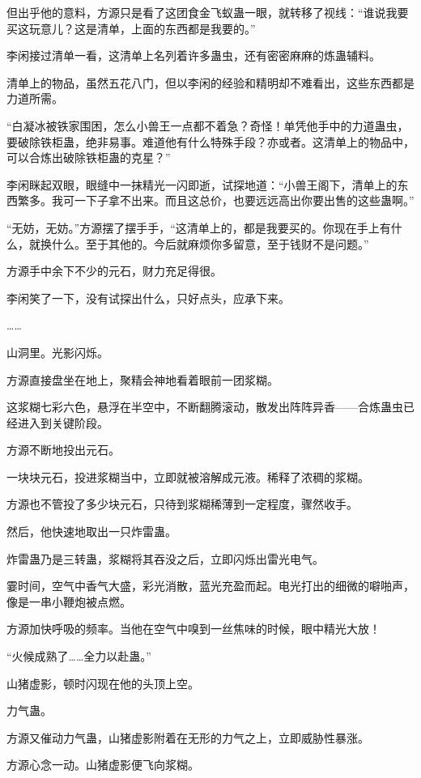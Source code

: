 \begin{this_body}
但出乎他的意料，方源只是看了这团食金飞蚁蛊一眼，就转移了视线：“谁说我要买这玩意儿？这是清单，上面的东西都是我要的。”

李闲接过清单一看，这清单上名列着许多蛊虫，还有密密麻麻的炼蛊辅料。

清单上的物品，虽然五花八门，但以李闲的经验和精明却不难看出，这些东西都是力道所需。

“白凝冰被铁家围困，怎么小兽王一点都不着急？奇怪！单凭他手中的力道蛊虫，要破除铁柜蛊，绝非易事。难道他有什么特殊手段？亦或者。这清单上的物品中，可以合炼出破除铁柜蛊的克星？”

李闲眯起双眼，眼缝中一抹精光一闪即逝，试探地道：“小兽王阁下，清单上的东西繁多。我可一下子拿不出来。而且这总价，也要远远高出你要出售的这些蛊啊。”

“无妨，无妨。”方源摆了摆手手，“这清单上的，都是我要买的。你现在手上有什么，就换什么。至于其他的。今后就麻烦你多留意，至于钱财不是问题。”

方源手中余下不少的元石，财力充足得很。

李闲笑了一下，没有试探出什么，只好点头，应承下来。

……

山洞里。光影闪烁。

方源直接盘坐在地上，聚精会神地看着眼前一团浆糊。

这浆糊七彩六色，悬浮在半空中，不断翻腾滚动，散发出阵阵异香——合炼蛊虫已经进入到关键阶段。

方源不断地投出元石。

一块块元石，投进浆糊当中，立即就被溶解成元液。稀释了浓稠的浆糊。

方源也不管投了多少块元石，只待到浆糊稀薄到一定程度，骤然收手。

然后，他快速地取出一只炸雷蛊。

炸雷蛊乃是三转蛊，浆糊将其吞没之后，立即闪烁出雷光电气。

霎时间，空气中香气大盛，彩光消散，蓝光充盈而起。电光打出的细微的噼啪声，像是一串小鞭炮被点燃。

方源加快呼吸的频率。当他在空气中嗅到一丝焦味的时候，眼中精光大放！

“火候成熟了……全力以赴蛊。”

山猪虚影，顿时闪现在他的头顶上空。

力气蛊。

方源又催动力气蛊，山猪虚影附着在无形的力气之上，立即威胁性暴涨。

方源心念一动。山猪虚影便飞向浆糊。


\end{this_body}
